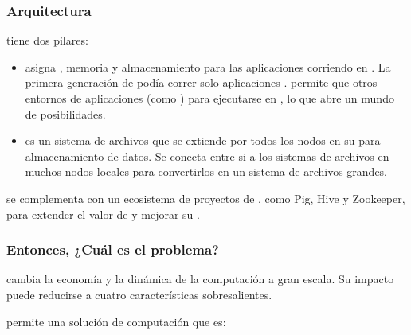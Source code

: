 \subsubsection*{Arquitectura \highLevelCPT} 
\apacheNAME \hadoopNAME tiene dos pilares:

\begin{itemize}
	\item \hadoopYarnNAME asigna \cpuPC, memoria y almacenamiento para las aplicaciones corriendo en \clustersAS \hadoopNAME. La primera generación de \hadoopNAME podía correr solo aplicaciones \hadoopMapReduceNAME. \hadoopYarnNAME permite que otros entornos de aplicaciones (como \sparkNAME) para ejecutarse en \hadoopNAME, lo que abre un mundo de posibilidades.
	
	\item \hadoophdfsNAME es un sistema de archivos que se extiende por todos los nodos en su \clusterAS \hadoopNAME para almacenamiento de datos. Se conecta entre si a los sistemas de archivos en muchos nodos locales para convertirlos en un sistema de archivos grandes.
\end{itemize}

\hadoopNAME se complementa con un ecosistema de proyectos de \apacheNAME, como Pig\cite{online_ibm_meaning_pig}, Hive\cite{online_ibm_meaning_hive} y Zookeeper\cite{online_ibm_meaning_zookeeper}, para extender el valor de \hadoopNAME y mejorar su \usabilityQA.


\subsubsection*{Entonces, ¿Cuál es el problema?}

\hadoopNAME cambia la economía y la dinámica de la computación a gran escala. Su impacto puede reducirse a cuatro características sobresalientes.

\hadoopNAME permite una solución de computación que es:

